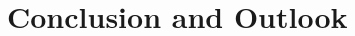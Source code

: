 \documentclass[preprint,12pt]{elsarticle}
\begin{document}



\section{Conclusion and Outlook}
\label{sec:conclusion}






\begin{thebibliography}{00}


\bibitem[ ()]{}

\end{thebibliography}
\end{document}
